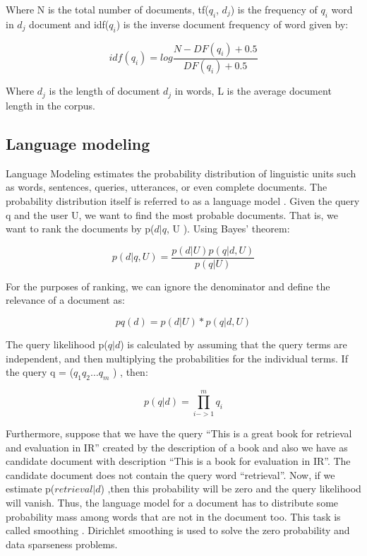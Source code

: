 Where N is the total number of documents, tf($q_i$, $d_j$) is the frequency of $q_i$ word in $d_j$ document and idf($q_i$) is the inverse document frequency of word given by:

\begin{equation}
idf(q_i) = log \frac{ N-DF(q_i) + 0.5 } { DF(q_i) +0.5 }
\end{equation}

Where $d_j$ is the length of document $d_j$ in words, L is the average document length in the corpus.

\subsection{Language modeling}

Language Modeling estimates the probability distribution of linguistic units such as words, sentences, queries, utterances, or even complete documents. The probability distribution itself is referred to as a language model \cite{CroftLafferty}. Given the query q and the user U, we want to find the most probable documents. That is, we want to rank the documents by p($d|q$, U ). Using Bayes' theorem:

\begin{equation}
p(d|q, U ) = \frac{p(d|U )p(q|d, U )} {p(q|U)}
\end{equation}

For the purposes of ranking, we can ignore the denominator and define the relevance of a document as:

\begin{equation}
pq (d) = p(d|U ) * p(q|d, U )
\end{equation}

The query likelihood p($q|d$) is calculated by assuming that the query terms are independent, and then multiplying the probabilities for the individual terms. If the query q = ($q_1 q_2 \ldots q_m$ ) , then:

\[p(q|d) =\prod_{i->1}^{m} q_i\]


Furthermore, suppose that we have the query ``This is a great book for retrieval and evaluation in IR'' created by the description of a book and also we have as candidate document with description ``This is a book for evaluation in IR''. The candidate document does not contain the query word ``retrieval''. Now, if we estimate p($retrieval|d$) ,then this probability will be zero and the query likelihood will vanish. Thus, the language model for a document has to distribute some probability mass among words that are not in the document too. This task is called smoothing  \cite{ZhaiLaferty}. Dirichlet smoothing is used to solve the zero probability and data sparseness problems.

